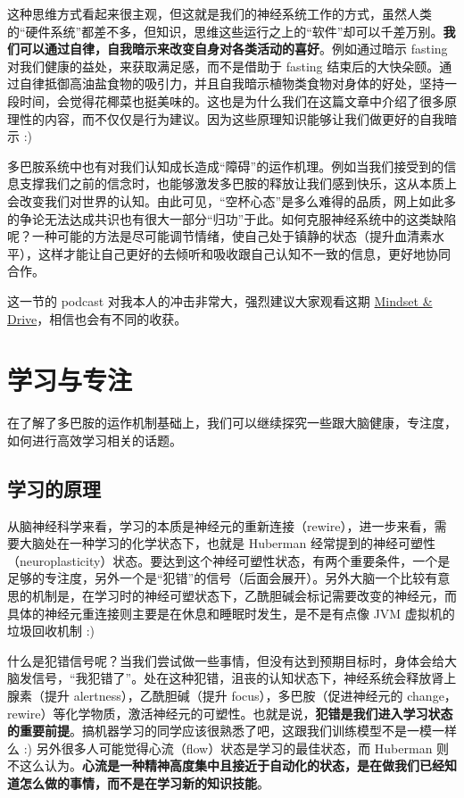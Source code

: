 \documentclass{report}
\begin{document}
这种思维方式看起来很主观，但这就是我们的神经系统工作的方式，虽然人类的“硬件系统”都差不多，但知识，思维这些运行之上的“软件”却可以千差万别。\textbf{我们可以通过自律，自我暗示来改变自身对各类活动的喜好}。例如通过暗示 fasting 对我们健康的益处，来获取满足感，而不是借助于 fasting 结束后的大快朵颐。通过自律抵御高油盐食物的吸引力，并且自我暗示植物类食物对身体的好处，坚持一段时间，会觉得花椰菜也挺美味的。这也是为什么我们在这篇文章中介绍了很多原理性的内容，而不仅仅是行为建议。因为这些原理知识能够让我们做更好的自我暗示 :)

多巴胺系统中也有对我们认知成长造成“障碍”的运作机理。例如当我们接受到的信息支撑我们之前的信念时，也能够激发多巴胺的释放让我们感到快乐，这从本质上会改变我们对世界的认知。由此可见，“空杯心态”是多么难得的品质，网上如此多的争论无法达成共识也有很大一部分“归功”于此。如何克服神经系统中的这类缺陷呢？一种可能的方法是尽可能调节情绪，使自己处于镇静的状态（提升血清素水平），这样才能让自己更好的去倾听和吸收跟自己认知不一致的信息，更好地协同合作。

这一节的 podcast 对我本人的冲击非常大，强烈建议大家观看这期 \href{https://hubermanlab.com/controlling-your-dopamine-for-motivation-focus-and-satisfaction/}{Mindset \& Drive}，相信也会有不同的收获。

\chapter{学习与专注}

在了解了多巴胺的运作机制基础上，我们可以继续探究一些跟大脑健康，专注度，如何进行高效学习相关的话题。

\section{学习的原理}

从脑神经科学来看，学习的本质是神经元的重新连接（rewire），进一步来看，需要大脑处在一种学习的化学状态下，也就是 Huberman 经常提到的神经可塑性（neuroplasticity）状态。要达到这个神经可塑性状态，有两个重要条件，一个是足够的专注度，另外一个是“犯错”的信号（后面会展开）。另外大脑一个比较有意思的机制是，在学习时的神经可塑状态下，乙酰胆碱会标记需要改变的神经元，而具体的神经元重连接则主要是在休息和睡眠时发生，是不是有点像 JVM 虚拟机的垃圾回收机制 :)

什么是犯错信号呢？当我们尝试做一些事情，但没有达到预期目标时，身体会给大脑发信号，“我犯错了”。处在这种犯错，沮丧的认知状态下，神经系统会释放肾上腺素（提升 alertness），乙酰胆碱（提升 focus），多巴胺（促进神经元的 change，rewire）等化学物质，激活神经元的可塑性。也就是说，\textbf{犯错是我们进入学习状态的重要前提}。搞机器学习的同学应该很熟悉了吧，这跟我们训练模型不是一模一样么 :) 另外很多人可能觉得心流（flow）状态是学习的最佳状态，而 Huberman 则不这么认为。\textbf{心流是一种精神高度集中且接近于自动化的状态，是在做我们已经知道怎么做的事情，而不是在学习新的知识技能}。
\end{document}
